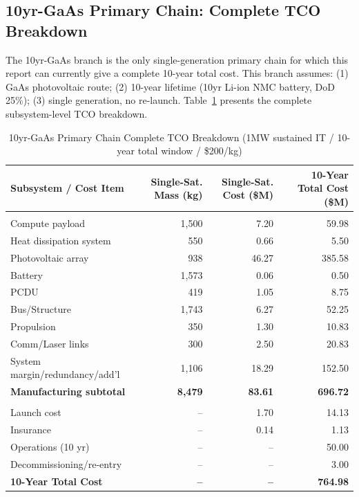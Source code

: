 \subsection{10yr-GaAs Primary Chain: Complete TCO Breakdown}

The 10yr-GaAs branch is the only single-generation primary chain for which this report can currently give a complete 10-year total cost. This branch assumes: (1) GaAs photovoltaic route; (2) 10-year lifetime (10yr Li-ion NMC battery, DoD 25\%); (3) single generation, no re-launch. Table~\ref{tab:gaas10_tco} presents the complete subsystem-level TCO breakdown.

\begin{table}[H]
\centering
\caption{10yr-GaAs Primary Chain Complete TCO Breakdown (1\;MW sustained IT / 10-year total window / \$200/kg)}
\label{tab:gaas10_tco}
\footnotesize
\begin{tabular}{>{\raggedright\arraybackslash}p{3.8cm}rrr}
\toprule
\textbf{Subsystem / Cost Item} & \textbf{Single-Sat. Mass (kg)} & \textbf{Single-Sat. Cost (\$M)} & \textbf{10-Year Total Cost (\$M)} \\
\midrule
\multicolumn{4}{>{\raggedright\arraybackslash}p{\textwidth}}{\textit{Manufacturing sub-items (single-sat. \$83.61M $\times$ 8.33 satellites $\times$ 1 generation)}} \\
\quad Compute payload        & 1,500 & 7.20  & 59.98 \\
\quad Heat dissipation system & 550   & 0.66  & 5.50 \\
\quad Photovoltaic array      & 938   & 46.27 & 385.58 \\
\quad Battery                 & 1,573 & 0.06  & 0.50 \\
\quad PCDU                    & 419   & 1.05  & 8.75 \\
\quad Bus/Structure           & 1,743 & 6.27  & 52.25 \\
\quad Propulsion              & 350   & 1.30  & 10.83 \\
\quad Comm/Laser links        & 300   & 2.50  & 20.83 \\
\quad System margin/redundancy/add'l & 1,106 & 18.29 & 152.50 \\
\midrule
\textbf{Manufacturing subtotal}  & \textbf{8,479} & \textbf{83.61} & \textbf{696.72} \\
\midrule
\multicolumn{4}{>{\raggedright\arraybackslash}p{\textwidth}}{\textit{Non-manufacturing cost items}} \\
\quad Launch cost             & -- & 1.70  & 14.13 \\
\quad Insurance               & -- & 0.14  & 1.13 \\
\quad Operations (10 yr)      & -- & --    & 50.00 \\
\quad Decommissioning/re-entry & -- & --    & 3.00 \\
\midrule
\textbf{10-Year Total Cost}   & \textbf{--} & \textbf{--} & \textbf{764.98} \\
\bottomrule
\end{tabular}
\end{table}

